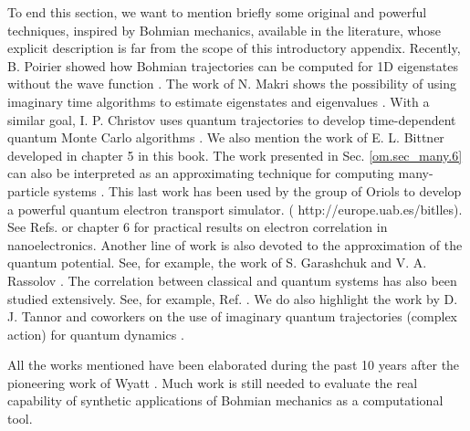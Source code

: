 \documentclass[onecolumn,nofootinbib, secnumarabic, amsmath, nobibnotes,12pt,aps,pra]{revtex4-1}
\newcommand{\sref}[1]{Sec. \ref{#1}}
\begin{document}
To end this section, we want to mention briefly some original and
powerful techniques, inspired by Bohmian mechanics, available in the
literature, whose explicit description is far from the scope of this
introductory appendix. Recently, B. Poirier showed how Bohmian
trajectories can be computed for 1D eigenstates without the wave
function \cite{om.poirier}. The work of N. Makri shows the possibility of using
imaginary time algorithms to estimate eigenstates and eigenvalues
\cite{om.imaginarytime}. With a similar goal, I. P. Christov uses
quantum trajectories to develop time-dependent quantum Monte Carlo
algorithms \cite{om.ivan,om.ivan2}. We also mention the work of E.
L. Bittner \cite{om.extra16} developed in chapter 5 in this book.
The work presented in \sref{om.sec_many.6} can also be interpreted as an
approximating technique for computing many-particle systems
\cite{om.oriolsprl}. This last work has been used by the group of
Oriols to develop a powerful quantum electron transport simulator. (
http://europe.uab.es/bitlles). See Refs.
\cite{om.oriolsexample1,om.oriolsexample2} or chapter 6 for
practical results on electron correlation in nanoelectronics.
Another line of work is also devoted to the approximation of the
quantum potential. See, for example, the work of S. Garashchuk and
V. A. Rassolov \cite{om.gara}. The correlation between classical and
quantum systems has also been studied extensively. See, for example,
Ref. \cite{om.extra13}. We do also highlight the work by D. J.
Tannor and coworkers on the use of imaginary quantum trajectories
(complex action) for quantum dynamics
\cite{om.imaginaryaction,om.imaginaryactionprl}.

All the works mentioned have been elaborated during the past 10
years after the pioneering work of Wyatt
\cite{om.Wyatt1,om.extra17}. Much work is still needed to evaluate
the real capability of synthetic applications of Bohmian mechanics
as a computational tool.%
\end{document}
